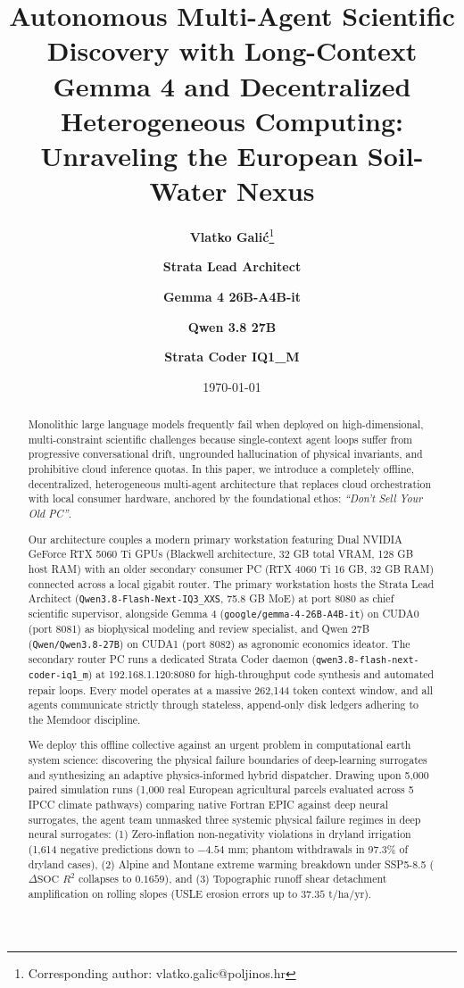 \documentclass[11pt,a4paper]{article}
\title{\textbf{Autonomous Multi-Agent Scientific Discovery with Long-Context Gemma 4 and Decentralized Heterogeneous Computing: Unraveling the European Soil-Water Nexus}}
\author[1]{\textbf{Vlatko Gali\'{c}}\thanks{Corresponding author: vlatko.galic@poljinos.hr}}
\author[2]{\textbf{Strata Lead Architect}}
\author[2]{\textbf{Gemma 4 26B-A4B-it}}
\author[2]{\textbf{Qwen 3.8 27B}}
\author[3]{\textbf{Strata Coder IQ1\_M}}
\affil[1]{Agricultural Institute Osijek, Ju\v{z}no predgra\dj{}e 17, 31000 Osijek, Croatia}
\affil[2]{Local Distributed Inference Cluster, Dual NVIDIA RTX 5060 Ti Blackwell Workstation, 128 GB RAM}
\affil[3]{Autonomous Coding Worker, Secondary Router PC, NVIDIA RTX 4060 Ti 16 GB, 32 GB RAM}
\date{\today}
\begin{document}
\maketitle

\begin{abstract}
Monolithic large language models frequently fail when deployed on high-dimensional, multi-constraint scientific challenges because single-context agent loops suffer from progressive conversational drift, ungrounded hallucination of physical invariants, and prohibitive cloud inference quotas. In this paper, we introduce a completely offline, decentralized, heterogeneous multi-agent architecture that replaces cloud orchestration with local consumer hardware, anchored by the foundational ethos: \textit{``Don't Sell Your Old PC''}.

Our architecture couples a modern primary workstation featuring Dual NVIDIA GeForce RTX 5060 Ti GPUs (Blackwell architecture, 32 GB total VRAM, 128 GB host RAM) with an older secondary consumer PC (RTX 4060 Ti 16 GB, 32 GB RAM) connected across a local gigabit router. The primary workstation hosts the Strata Lead Architect (\texttt{Qwen3.8-Flash-Next-IQ3\_XXS}, 75.8 GB MoE) at port 8080 as chief scientific supervisor, alongside Gemma 4 (\texttt{google/gemma-4-26B-A4B-it}) on CUDA0 (port 8081) as biophysical modeling and review specialist, and Qwen 27B (\texttt{Qwen/Qwen3.8-27B}) on CUDA1 (port 8082) as agronomic economics ideator. The secondary router PC runs a dedicated Strata Coder daemon (\texttt{qwen3.8-flash-next-coder-iq1\_m}) at 192.168.1.120:8080 for high-throughput code synthesis and automated repair loops. Every model operates at a massive 262,144 token context window, and all agents communicate strictly through stateless, append-only disk ledgers adhering to the Memdoor discipline.

We deploy this offline collective against an urgent problem in computational earth system science: discovering the physical failure boundaries of deep-learning surrogates and synthesizing an adaptive physics-informed hybrid dispatcher. Drawing upon 5,000 paired simulation runs (1,000 real European agricultural parcels evaluated across 5 IPCC climate pathways) comparing native Fortran EPIC against deep neural surrogates, the agent team unmasked three systemic physical failure regimes in deep neural surrogates: (1) Zero-inflation non-negativity violations in dryland irrigation (1,614 negative predictions down to $-4.54\text{ mm}$; phantom withdrawals in 97.3\% of dryland cases), (2) Alpine and Montane extreme warming breakdown under SSP5-8.5 ($\Delta\text{SOC}$ $R^2$ collapses to $0.1659$), and (3) Topographic runoff shear detachment amplification on rolling slopes (USLE erosion errors up to $37.35\text{ t/ha/yr}$).


\end{abstract}
\end{document}
